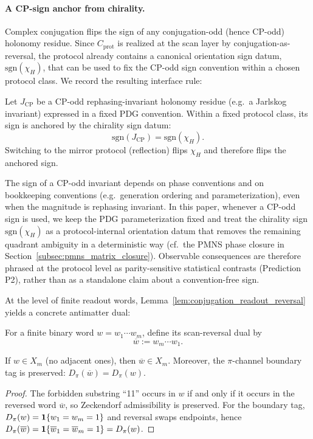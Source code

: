 \paragraph{A CP-sign anchor from chirality.}
Complex conjugation flips the sign of any conjugation-odd (hence CP-odd) holonomy residue.
Since $C_{\mathrm{prot}}$ is realized at the scan layer by conjugation-as-reversal, the protocol already contains a canonical orientation sign datum, $\mathrm{sgn}(\chi_H)$, that can be used to fix the CP-odd sign convention within a chosen protocol class.
We record the resulting interface rule:
\begin{definition}\label{def:chi_cp_sign}
Let $J_{\mathrm{CP}}$ be a CP-odd rephasing-invariant holonomy residue (e.g.\ a Jarlskog invariant) expressed in a fixed PDG convention.
Within a fixed protocol class, its sign is anchored by the chirality sign datum:
\[
\mathrm{sgn}(J_{\mathrm{CP}})=\mathrm{sgn}(\chi_H).
\]
Switching to the mirror protocol (reflection) flips $\chi_H$ and therefore flips the anchored sign.
\end{definition}
\begin{remark}\label{rem:cp_sign_convention}
The sign of a CP-odd invariant depends on phase conventions and on bookkeeping conventions (e.g.\ generation ordering and parameterization), even when the magnitude is rephasing invariant.
In this paper, whenever a CP-odd sign is used, we keep the PDG parameterization fixed and treat the chirality sign $\mathrm{sgn}(\chi_H)$ as a protocol-internal orientation datum that removes the remaining quadrant ambiguity in a deterministic way (cf.\ the PMNS phase closure in Section~\ref{subsec:pmns_matrix_closure}).
Observable consequences are therefore phrased at the protocol level as parity-sensitive statistical contrasts (Prediction P2), rather than as a standalone claim about a convention-free sign.
\end{remark}
At the level of finite readout words, Lemma~\ref{lem:conjugation_readout_reversal} yields a concrete antimatter dual:
\begin{definition}\label{def:word_reversal_dual}
For a finite binary word $w=w_1\cdots w_m$, define its scan-reversal dual by
\[
\overline{w}:=w_m\cdots w_1.
\]
\end{definition}
\begin{lemma}\label{lem:reverse_preserves_admissibility}
If $w\in X_m$ (no adjacent ones), then $\overline{w}\in X_m$.
Moreover, the $\pi$-channel boundary tag is preserved: $D_\pi(\overline{w})=D_\pi(w)$.
\end{lemma}
\begin{proof}
The forbidden substring ``11'' occurs in $w$ if and only if it occurs in the reversed word $\overline{w}$, so Zeckendorf admissibility is preserved.
For the boundary tag, $D_\pi(w)=\mathbf{1}\{w_1=w_m=1\}$ and reversal swaps endpoints, hence $D_\pi(\overline{w})=\mathbf{1}\{\overline{w}_1=\overline{w}_m=1\}=D_\pi(w)$.
\end{proof}

